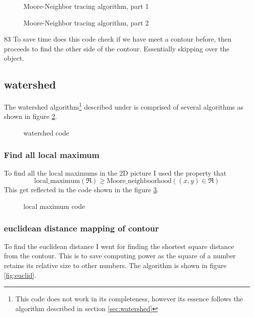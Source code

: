 \documentclass{article}
\begin{document}
\begin{figure}[H]

\caption{Moore-Neighbor tracing algorithm, part 1}
\label{fig:mooretracing}
\end{figure}
\begin{figure}[H]

\caption{Moore-Neighbor tracing algorithm, part 2}
\end{figure}

83
To save time does this code check if we have meet a contour before, then proceeds to find the other side of the contour. Essentially skipping over the object.

\subsection{watershed}
The watershed algorithm\footnote{This code does not work in its completeness, however its essence follows the algorithm described in section \ref{sec:watershed}} described under is comprised of several algorithms as shown in figure \ref{fig:watershed}.
\begin{figure}[H]

\caption{watershed code}
\label{fig:watershed}
\end{figure}

\subsubsection{Find all local maximum}
To find all the local maximums in the 2D picture I used the property that
$$
\text{local\_maximum}(\Re) \geq \text{Moore\_neighboorhood}((x,y)\in\Re)
$$
This get reflected in the code shown in the figure \ref{fig:maximum}.

\begin{figure}[H]

\caption{local maximum code}
\label{fig:maximum}
\end{figure}

\subsubsection[euclidean distance]{euclidean distance mapping of contour}
To find the euclidean distance I went for finding the shortest square distance from the contour. This is to save computing power as the square of a number retains its relative size to other numbers. The algorithm is shown in figure \ref{fig:euclid}.
\end{document}
